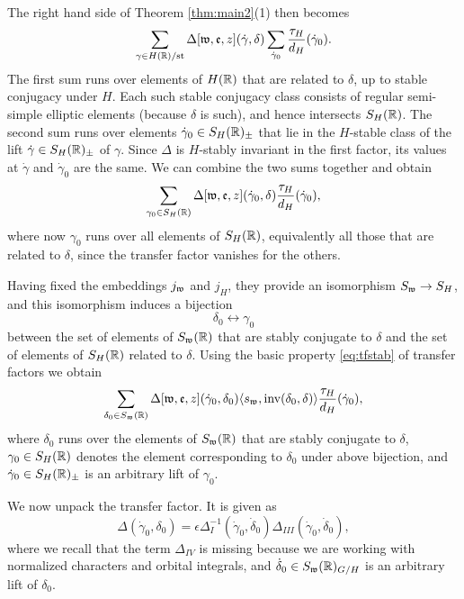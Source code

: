 \documentclass{article}
\theoremstyle{definition}
\numberwithin{equation}{section}
\renewcommand{\-}{\hyp{}}
\begin{document}
The right hand side of Theorem \ref{thm:main2}(1) then becomes
\[ \sum_{\gamma \in H(\mathbb{R})/\textrm{st}} \Delta[\mathfrak{w},\mathfrak{e},z](\dot\gamma,\delta)\sum_{\dot\gamma_0} \frac{\tau_H}{d_{H}}(\dot\gamma_0). \]
The first sum runs over elements of $H(\mathbb{R})$ that are related to $\delta$, up to stable conjugacy under $H$. Each such stable conjugacy class consists of regular semi-simple elliptic elements (because $\delta$ is such), and hence intersects $S_H(\mathbb{R})$. The second sum runs over elements $\dot\gamma_0 \in S_H(\mathbb{R})_\pm$ that lie in the $H$-stable class of the lift $\dot\gamma \in S_H(\mathbb{R})_\pm$ of $\gamma$. Since $\Delta$ is $H$-stably invariant in the first factor, its values at $\dot\gamma$ and $\dot\gamma_0$ are the same. We can combine the two sums together and obtain
\[ \sum_{\gamma_0 \in S_H(\mathbb{R})} \Delta[\mathfrak{w},\mathfrak{e},z](\dot\gamma_0,\delta) \frac{\tau_H}{d_{H}}(\dot\gamma_0), \]
where now $\gamma_0$ runs over all elements of $S_H(\mathbb{R})$, equivalently all those that are related to $\delta$, since the transfer factor vanishes for the others.


Having fixed the embeddings $j_{\mathfrak{w}}$ and $j_H$, they provide an isomorphism $S_{\mathfrak{w}} \to S_H$, and this isomorphism induces a bijection
\[ \delta_0 \leftrightarrow \gamma_0 \]
between the set of elements of $S_{\mathfrak{w}}(\mathbb{R})$ that are stably conjugate to $\delta$ and the set of elements of $S_H(\mathbb{R})$ related to $\delta$. Using the basic property \eqref{eq:tfstab} of transfer factors we obtain
\begin{equation} \label{eq:rhs1}
\sum_{\delta_0 \in S_{\mathfrak{w}}(\mathbb{R})} \Delta[\mathfrak{w},\mathfrak{e},z](\dot\gamma_0,\delta_0)\langle s_{\mathfrak{w}},\textrm{inv}(\delta_0,\delta)\rangle \frac{\tau_H}{d_{H}}(\dot\gamma_0),
\end{equation}
where $\delta_0$ runs over the elements of $S_{\mathfrak{w}}(\mathbb{R})$ that are stably conjugate to $\delta$, $\gamma_0 \in S_H(\mathbb{R})$ denotes the element corresponding to $\delta_0$ under above bijection, and $\dot\gamma_0 \in S_H(\mathbb{R})_\pm$ is an arbitrary lift of $\gamma_0$.

We now unpack the transfer factor. It is given as
\[ \Delta(\dot\gamma_0,\delta_0) = \epsilon\Delta_I^{-1}(\dot\gamma_0,\dot\delta_0)\Delta_{III}(\dot\gamma_0,\dot\delta_0), \]
where we recall that the term $\Delta_{IV}$ is missing because we are working with normalized characters and orbital integrals, and $\dot\delta_0 \in S_{\mathfrak{w}}(\mathbb{R})_{G/H}$ is an arbitrary lift of $\delta_0$.
\end{document}
